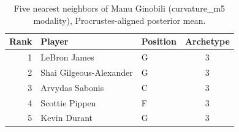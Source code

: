 \begin{table}[htbp]
  \centering\small
  \begin{tabular}{rllc}
    \toprule
    Rank & Player & Position & Archetype \\
    \midrule
    1 & LeBron James & G & 3 \\
    2 & Shai Gilgeous-Alexander & G & 3 \\
    3 & Arvydas Sabonis & C & 3 \\
    4 & Scottie Pippen & F & 3 \\
    5 & Kevin Durant & G & 3 \\
    \bottomrule
  \end{tabular}
  \caption{Five nearest neighbors of Manu Ginobili (curvature_m5 modality), Procrustes-aligned posterior mean.}
  \label{tab:Manu_Ginobili_neighbors_curvature_m5}
\end{table}

